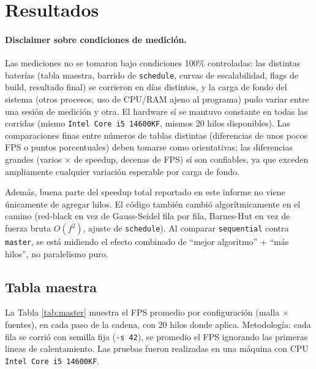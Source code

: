 \documentclass[11pt]{article}
\begin{document}
\newpage

\section{Resultados}\label{sec:resultados}

\paragraph{Disclaimer sobre condiciones de medición.} Las mediciones no
se tomaron bajo condiciones 100\% controladas: las distintas baterías
(tabla maestra, barrido de \texttt{schedule}, curvas de escalabilidad,
flags de build, resultado final) se corrieron en días distintos, y la
carga de fondo del sistema (otros procesos, uso de CPU/RAM ajeno al
programa) pudo variar entre una sesión de medición y otra. El hardware sí
se mantuvo constante en todas las corridas (mismo \texttt{Intel Core i5
14600KF}, mismos 20 hilos disponibles). Las comparaciones finas entre números
de tablas distintas (diferencias de unos pocos FPS o puntos porcentuales)
deben tomarse como orientativas; las diferencias grandes (varios $\times$
de speedup, decenas de FPS) sí son confiables, ya que exceden ampliamente
cualquier variación esperable por carga de fondo.

Además, buena parte del speedup total reportado en este informe no viene
  únicamente de agregar hilos. El código también cambió algorítmicamente en
el camino (red-black en vez de Gauss-Seidel fila por fila, Barnes-Hut en
vez de fuerza bruta $O(f^2)$, ajuste de \texttt{schedule}). Al comparar
\texttt{sequential} contra \texttt{master}, se está midiendo el efecto
combinado de ``mejor algoritmo'' + ``más hilos'', no paralelismo puro.

\subsection{Tabla maestra}

La Tabla \ref{tab:master} muestra el FPS promedio por configuración (malla
$\times$ fuentes), en cada paso de la cadena, con 20 hilos donde aplica.
Metodología: cada fila se corrió con semilla fija (\texttt{-s 42}), se
promedio el FPS ignorando las primeras lineas de calentamiento. Las pruebas fueron realizadas
en una máquina con CPU \texttt{Intel Core i5 14600KF}.
\end{document}
